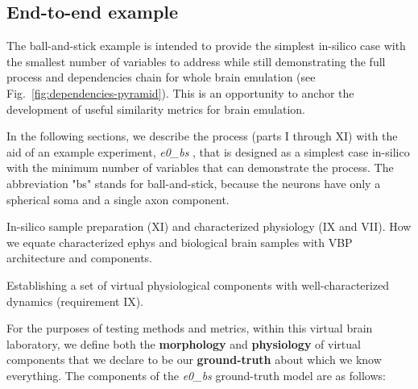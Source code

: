 \documentclass{ldr-article}
\def\firstexp{\textit{e0\_bs} }
\begin{document}
\subsection{End-to-end example}


The ball-and-stick example is intended to provide the simplest in-silico case with the smallest
number of variables to address while still demonstrating the full process and dependencies
chain for whole brain emulation (see Fig.~\ref{fig:dependencies-pyramid}). This is an opportunity to anchor the development of useful similarity metrics for brain emulation.

In the following sections, we describe the process (parts I through XI) with the aid of an example experiment, \firstexp, that is designed as a simplest case in-silico with the minimum number of variables that can demonstrate the process. The abbreviation "bs" stands for ball-and-stick, because the neurons have only a spherical soma and a single axon component.

In-silico sample preparation (XI) and characterized physiology (IX and VII).
How we equate characterized ephys and biological brain samples with VBP architecture and components.

Establishing a set of virtual physiological components with well-characterized dynamics (requirement IX).

For the purposes of testing methods and metrics, within this virtual brain laboratory, we define both the \textbf{morphology} and \textbf{physiology} of virtual components that we declare to be our \textbf{ground-truth} about which we know everything. The components of the \firstexp ground-truth model are as follows:
\end{document}

